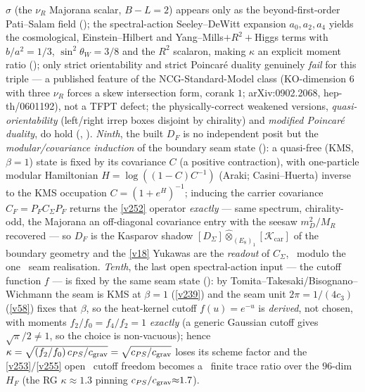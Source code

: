 \documentclass[11pt,a4paper]{article}
\begin{document}
\begin{keybox}
$\sigma$ (the $\nu_R$ Majorana scalar, $B{-}L{=}2$) appears only as the beyond-first-order Pati--Salam field
(); the spectral-action Seeley--DeWitt expansion $a_0,a_2,a_4$ yields the
cosmological, Einstein--Hilbert and Yang--Mills$+R^2+$Higgs terms with $b/a^2=1/3$, $\sin^2\theta_W=3/8$ and
the $R^2$ scalaron, making $\kappa$ an explicit moment ratio ();
only strict orientability and strict Poincar\'e duality genuinely \emph{fail} for this triple --- a
published feature of the NCG-Standard-Model class (KO-dimension $6$ with three $\nu_R$ forces a skew
intersection form, corank $1$; arXiv:0902.2068, hep-th/0601192), not a TFPT defect; the
physically-correct weakened versions, \emph{quasi-orientability} (left/right irrep boxes disjoint by
chirality) and \emph{modified Poincar\'e duality}, do hold (,
).
\emph{Ninth}, the built $D_F$ is no independent posit but the \emph{modular/covariance induction} of the
boundary seam state (): a quasi-free (KMS, $\beta{=}1$) state is
fixed by its covariance $C$ (a positive contraction), with one-particle modular Hamiltonian
$H=\log((1{-}C)C^{-1})$ (Araki; Casini--Huerta) inverse to the KMS occupation $C=(1{+}e^{H})^{-1}$; inducing
the carrier covariance $C_F=P_F C_\Sigma P_F$ returns the \vref{v252} operator \emph{exactly} --- same
spectrum, chirality-odd, the Majorana an off-diagonal covariance entry with the seesaw $m_D^2/M_R$ recovered
--- so $D_F$ is the Kasparov shadow $[D_\Sigma]\widehat\otimes_{(E_8)_1}[\mathcal K_{\mathrm{car}}]$ of the
boundary geometry and the \vref{v18} Yukawas are the \emph{readout} of $C_\Sigma$, \mE\ modulo the one \mO\
seam realisation.
\emph{Tenth}, the last open spectral-action input --- the cutoff function $f$ --- is fixed by the same seam
state (\veri{v259\_modular\_cutoff\_kappa.py}): by Tomita--Takesaki/Bisognano--Wichmann the seam is KMS at
$\beta{=}1$ (\vref{v239}) and the seam unit $2\pi{=}1/(4c_3)$ (\vref{v58}) fixes that $\beta$, so the
heat-kernel cutoff $f(u)=e^{-u}$ is \emph{derived}, not chosen, with moments $f_2/f_0=f_4/f_2=1$
\emph{exactly} (a generic Gaussian cutoff gives $\sqrt\pi/2\neq1$, so the choice is non-vacuous); hence
$\kappa=\sqrt{(f_2/f_0)\,c_{PS}/c_{\rm grav}}=\sqrt{c_{PS}/c_{\rm grav}}$ loses its scheme factor and the
\vref{v253}/\vref{v255} open \mO\ cutoff freedom becomes a \mC\ finite trace ratio over the $96$-dim $H_F$
(the RG $\kappa{\approx}1.3$ pinning $c_{PS}/c_{\rm grav}{\approx}1.7$).

\end{keybox}
\end{document}
